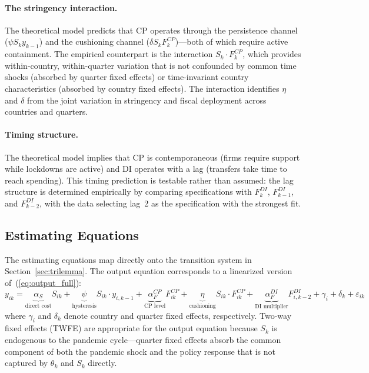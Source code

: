 \paragraph{The stringency interaction.} The theoretical model predicts that CP operates through the persistence channel ($\psi S_k y_{k-1}$) and the cushioning channel ($\delta S_k F_k^{CP}$)---both of which require active containment. The empirical counterpart is the interaction $S_k \cdot F_k^{CP}$, which provides within-country, within-quarter variation that is not confounded by common time shocks (absorbed by quarter fixed effects) or time-invariant country characteristics (absorbed by country fixed effects). The interaction identifies $\eta$ and $\delta$ from the joint variation in stringency and fiscal deployment across countries and quarters.

\paragraph{Timing structure.} The theoretical model implies that CP is contemporaneous (firms require support while lockdowns are active) and DI operates with a lag (transfers take time to reach spending). This timing prediction is testable rather than assumed: the lag structure is determined empirically by comparing specifications with $F_{k}^{DI}$, $F_{k-1}^{DI}$, and $F_{k-2}^{DI}$, with the data selecting lag~2 as the specification with the strongest fit.

\subsection{Estimating Equations}
\label{subsec:equations}

The estimating equations map directly onto the transition system in Section~\ref{sec:trilemma}. The output equation corresponds to a linearized version of~(\ref{eq:output_full}):
%
\begin{equation}
    y_{ik} = \underbrace{\alpha_S}_{\text{direct cost}} S_{ik}
    + \underbrace{\psi}_{\text{hysteresis}} S_{ik} \cdot y_{i,k-1}
    + \underbrace{\alpha_F^{CP}}_{\text{CP level}} F_{ik}^{CP}
    + \underbrace{\eta}_{\text{cushioning}} S_{ik} \cdot F_{ik}^{CP}
    + \underbrace{\alpha_F^{DI}}_{\text{DI multiplier}} F_{i,k-2}^{DI}
    + \gamma_i + \delta_k + \varepsilon_{ik}
    \label{eq:output_est}
\end{equation}
%
where $\gamma_i$ and $\delta_k$ denote country and quarter fixed effects, respectively. Two-way fixed effects (TWFE) are appropriate for the output equation because $S_k$ is endogenous to the pandemic cycle---quarter fixed effects absorb the common component of both the pandemic shock and the policy response that is not captured by $\theta_k$ and $S_k$ directly.

